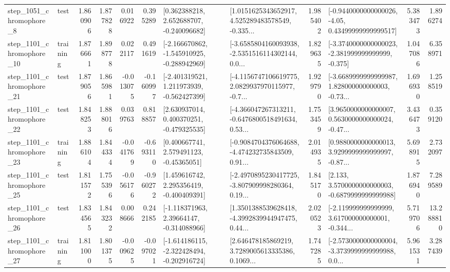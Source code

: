 \begin{tabular}{llrrrrllrlrr}
  step\_1051\_chromophore\_8 &      test &      1.860906 &    1.877828 &      0.016922 &  0.395289 &    [0.362388218, 2.652688707, -0.240096682] &  [1.0151625343652917, 4.525289483578549, -0.335... &       1.985402 &  [-0.9440000000000026, -4.05, 0.43499999999999517] &            5.383473 &          1.896274 \\
 step\_1101\_chromophore\_10 &  training &      1.876661 &    1.898778 &      0.022117 &  0.491619 &  [-2.166670862, -1.545910925, -0.288942969] &  [-3.6585804160093938, -2.5351516114302144, 0.0... &       1.829635 &  [-3.3740000000000023, -2.381999999999999, -0.375] &            1.047086 &          6.358971 \\
 step\_1101\_chromophore\_21 &      test &      1.879056 &    1.865981 &     -0.013075 & -0.160997 &   [-2.401319521, 1.211973939, -0.562427399] &  [-4.1156747106619775, 2.0829937970115977, -0.7... &       1.929790 &  [-3.6689999999999987, 1.828000000000003, -0.73... &            1.696930 &          1.258519 \\
 step\_1101\_chromophore\_22 &      test &      1.848253 &    1.888016 &      0.039763 &  0.818857 &    [2.630937014, 0.400370251, -0.479325535] &  [-4.366047267313211, -0.6476800518491634, 0.53... &       1.753459 &  [3.9650000000000007, 0.5630000000000024, -0.47... &            3.436473 &          0.359120 \\
 step\_1101\_chromophore\_23 &  training &      1.886104 &    1.844334 &     -0.041769 & -0.693110 &     [0.400667741, 2.579491123, -0.45365051] &  [-0.9084704376064688, -4.474232735843509, 0.91... &       2.014935 &  [0.9880000000000013, 3.9299999999999997, -0.87... &            5.698915 &          2.732097 \\
 step\_1101\_chromophore\_25 &      test &      1.811572 &    1.755396 &     -0.056176 & -0.960272 &    [1.459616742, 2.295356419, -0.400409391] &  [-2.4970895230417725, -3.807909998280364, 0.19... &       1.845170 &   [2.133, 3.5700000000000003, -0.6879999999999988] &            1.876940 &          7.289589 \\
 step\_1101\_chromophore\_26 &      test &      1.834565 &    1.843232 &      0.008666 &  0.242185 &    [-1.118371963, 2.39664147, -0.314088966] &  [1.3501388539628418, -4.3992839944947475, 0.44... &       2.020523 &  [-2.119999999999999, 3.617000000000001, -0.344... &            5.719706 &         13.288810 \\
 step\_1101\_chromophore\_27 &  training &      1.811000 &    1.801375 &     -0.009625 & -0.097021 &  [-1.614186115, -2.322428494, -0.202916724] &  [2.646478185869219, 3.7289005613335386, 0.1069... &       1.747285 &  [-2.5730000000000004, -3.3739999999999988, 0.0... &            5.961531 &          3.287439 \\

\end{tabular}
